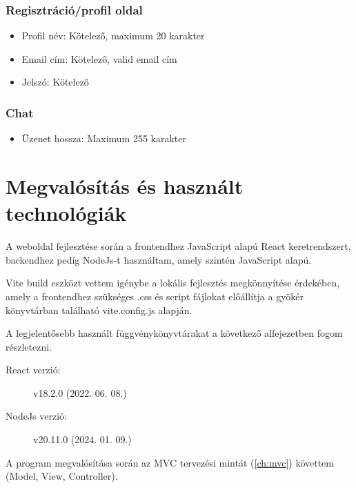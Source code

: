 \subsubsection{Regisztráció/profil oldal}

\begin{itemize}
	\item Profil név: Kötelező, maximum 20 karakter
	\item Email cím: Kötelező, valid email cím
	\item Jelszó: Kötelező
\end{itemize}

\subsubsection{Chat}

\begin{itemize}
	\item Üzenet hossza: Maximum 255 karakter
\end{itemize}

\pagebreak

\section{Megvalósítás és használt technológiák}

A weboldal fejlesztése során a frontendhez JavaScript alapú React \cite{react} keretrendszert, backendhez pedig NodeJs-t \cite{nodejs} használtam, amely szintén JavaScript alapú.

\bigskip

Vite build eszközt vettem igénybe a lokális fejlesztés megkönnyítése érdekében, amely a frontendhez szükséges .css és script fájlokat előállítja a gyökér könyvtárban található vite.config.js alapján.

\bigskip

A legjelentősebb használt függvénykönyvtárakat a következő alfejezetben fogom részletezni.

\bigskip

\begin{description}
	\item[React verzió:] v18.2.0 (2022. 06. 08.)
	\item[NodeJs verzió:] v20.11.0 (2024. 01. 09.)
\end{description}

\bigskip

A program megvalósítása során az MVC tervezési mintát (\ref{ch:mvc}) követtem (Model, View, Controller).


